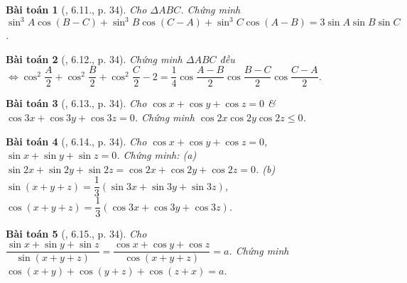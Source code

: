 \documentclass{article}
\newtheorem{baitoan}{Bài toán}
\begin{document}
\begin{baitoan}[\cite{Hung_nang_cao_phat_trien_Toan_11_tap_1}, 6.11., p. 34]
	Cho $\Delta ABC$. Chứng minh $\sin^3A\cos(B - C) + \sin^3B\cos(C - A) + \sin^3C\cos(A - B) = 3\sin A\sin B\sin C$.
\end{baitoan}

\begin{baitoan}[\cite{Hung_nang_cao_phat_trien_Toan_11_tap_1}, 6.12., p. 34]
	Chứng minh $\Delta ABC$ đều $\Leftrightarrow\cos^2\dfrac{A}{2} + \cos^2\dfrac{B}{2} + \cos^2\dfrac{C}{2} - 2 = \dfrac{1}{4}\cos\dfrac{A - B}{2}\cos\dfrac{B - C}{2}\cos\dfrac{C - A}{2}$.
\end{baitoan}

\begin{baitoan}[\cite{Hung_nang_cao_phat_trien_Toan_11_tap_1}, 6.13., p. 34]
	Cho $\cos x + \cos y + \cos z = 0$ \& $\cos3x + \cos3y + \cos3z = 0$. Chứng minh $\cos2x\cos2y\cos2z\le0$.
\end{baitoan}

\begin{baitoan}[\cite{Hung_nang_cao_phat_trien_Toan_11_tap_1}, 6.14., p. 34]
	Cho $\cos x + \cos y + \cos z = 0$, $\sin x + \sin y + \sin z = 0$. Chứng minh: (a) $\sin2x + \sin2y + \sin2z = \cos2x + \cos2y + \cos2z = 0$. (b) $\sin(x + y + z) = \dfrac{1}{3}(\sin3x + \sin3y + \sin3z)$, $\cos(x + y + z) = \dfrac{1}{3}(\cos3x + \cos3y + \cos3z)$.
\end{baitoan}

\begin{baitoan}[\cite{Hung_nang_cao_phat_trien_Toan_11_tap_1}, 6.15., p. 34]
	Cho $\dfrac{\sin x + \sin y + \sin z}{\sin(x + y + z)} = \dfrac{\cos x + \cos y + \cos z}{\cos(x + y + z)} = a$. Chứng minh $\cos(x + y) + \cos(y + z) + \cos(z + x) = a$.
\end{baitoan}


\printbibliography[heading=bibintoc]
	
\end{document}
